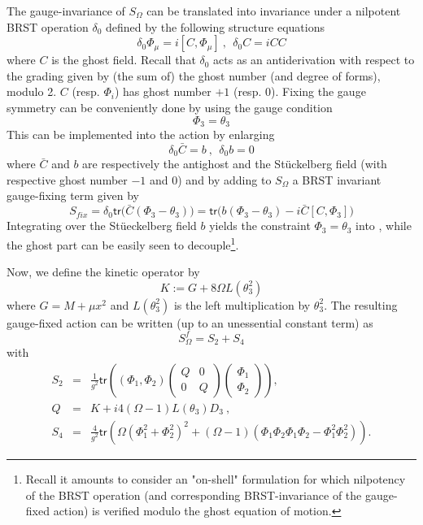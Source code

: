 \documentclass[10pt]{book}
\newcommand{\tr}{\mathsf{tr}}
\theoremstyle{break}
\begin{document}
%
The gauge-invariance of $S_\Omega$ %
can be translated into invariance under a nilpotent BRST operation $\delta_0$ defined by the following structure equations %
%
\begin{equation}
\delta_0 \Phi_\mu = i [C,\Phi_\mu] \ , \ \ \delta_0C=iCC%
\end{equation}
%
where $C$ is the ghost field. Recall that $\delta_0$ acts as an antiderivation with respect to the grading given by (the sum of) the ghost number (and degree of forms), modulo 2. $C$ (resp. $\Phi_i$) has ghost number $+1$ (resp. $0$). Fixing the gauge symmetry can be conveniently done by using the gauge condition 
\begin{equation}
\Phi_3=\theta_3%
\end{equation}
This can be implemented into the action by enlarging %
%
\begin{equation}
\delta_0 {\bar{C}} = b \ , \ \ \delta_0b = 0 %
\end{equation}
%
where ${\bar{C}}$ and $b$ are respectively the antighost and the St\"uckelberg field (with respective ghost number $-1$ and $0$) and by adding to $S_\Omega$ a BRST invariant gauge-fixing term given by %
%
\begin{equation}
S_{fix}=\delta_0\tr\big({\bar{C}}(\Phi_3-\theta_3) \big)=\tr\big(b(\Phi_3-\theta_3)-i{\bar{C}}[C,\Phi_3]\big)%
\end{equation}
%
Integrating over the St\"ueckelberg field $b$ yields the constraint $\Phi_3=\theta_3$ into %
, while the ghost part can be easily seen to decouple{\footnote{Recall it amounts to consider an "on-shell" formulation for which nilpotency of the BRST operation (and corresponding BRST-invariance of the gauge-fixed action) is verified modulo the ghost equation of motion.}}. \par 
Now, we define the kinetic operator by%
%
\begin{equation}
K:=G+8\Omega L(\theta_3^2)%
\end{equation}
where $G=M+\mu x^2$ and $L(\theta^{2}_{3})$ is the left multiplication by $\theta^{2}_{3}$.
%
The resulting gauge-fixed action can be written (up to an unessential constant term) as
%
\begin{equation}
S^f_\Omega=S_2+S_4%
\end{equation}
with%
\begin{eqnarray}
S_2 &=& \frac{1}{g^2} \tr ((\Phi_1,\Phi_2)
\begin{pmatrix}
Q&0\\
0&Q
\end{pmatrix} 
\begin{pmatrix}
\Phi_1\\
\Phi_2
\end{pmatrix} 
) , \nonumber \\
Q &=& K + i4 (\Omega-1) L(\theta_3) D_3 \ , %
\\[5pt]
S_4 &=& \frac{4}{g^2} \tr \left( \Omega (\Phi_1^2 + \Phi_2^2)^2 + (\Omega-1)(\Phi_1\Phi_2\Phi_1\Phi_2 - \Phi_1^2\Phi_2^2) \right) . %
\end{eqnarray}
\end{document}
